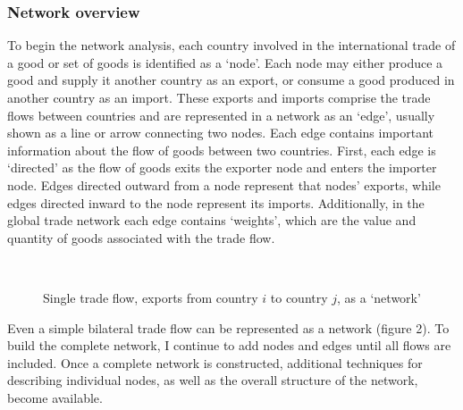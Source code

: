 \documentclass[10pt,letterpaper]{article}
\begin{document}
\subsubsection{Network overview} \label{nw2}
To begin the network analysis, each country involved in the international trade of a good or set of goods is identified as a `node'. Each node may either produce a good and supply it another country as an export, or consume a good produced in another country as an import. These exports and imports comprise the trade flows between countries and are represented in a network as an `edge', usually shown as a line or arrow connecting two nodes. Each edge contains important information about the flow of goods between two countries. First, each edge is `directed' as the flow of goods exits the exporter node and enters the importer node. Edges directed outward from a node represent that nodes' exports, while edges directed inward to the node represent its imports. Additionally, in the global trade network each edge contains `weights', which are the value and quantity of goods associated with the trade flow.

\begin{figure}[!htb]\label{fig:nw_simple}
  \caption{Single trade flow, exports from country $i$ to country $j$, as a `network'}
  {\centering
{}\\}
\end{figure}

Even a simple bilateral trade flow can be represented as a network (figure 2). To build the complete network, I continue to add nodes and edges until all flows are included. Once a complete network is constructed, additional techniques for describing individual nodes, as well as the overall structure of the network, become available.
\end{document}
